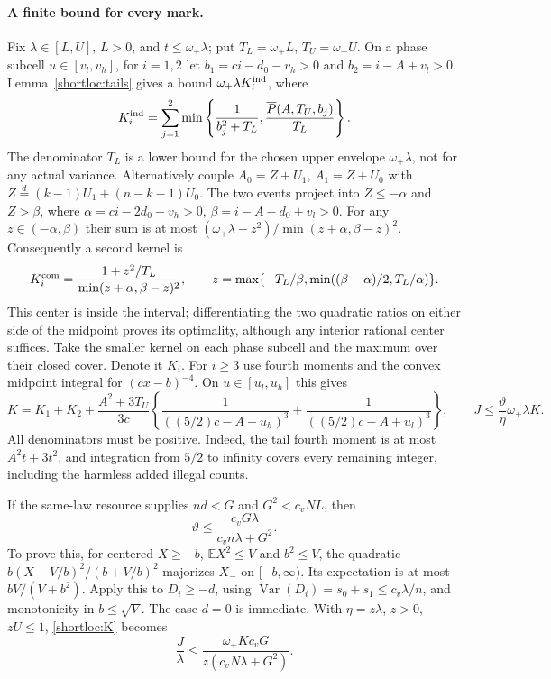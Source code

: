 \paragraph{A finite bound for every mark.}
Fix $\lambda\in[L,U]$, $L>0$, and $t\le\omega_+\lambda$; put
$T_L=\omega_+L$, $T_U=\omega_+U$. On a phase subcell $u\in[v_l,v_h]$,
for $i=1,2$ let $b_1=ci-d_0-v_h>0$ and $b_2=i-A+v_l>0$.
Lemma~\ref{shortloc:tails} gives a bound $\omega_+\lambda K_i^{\rm ind}$,
where
\[
 K_i^{\rm ind}=\sum_{j=1}^2\min\left\{\frac1{b_j^2+T_L},
                          \frac{\overline P(A,T_U,b_j)}{T_L}\right\}.
\]
The denominator $T_L$ is a lower bound for the chosen upper envelope
$\omega_+\lambda$, not for any actual variance.
Alternatively couple $A_0=Z+U_1$, $A_1=Z+U_0$ with
$Z\overset d=(k-1)U_1+(n-k-1)U_0$. The two events project into
$Z\le-\alpha$ and $Z>\beta$, where
$\alpha=ci-2d_0-v_h>0$, $\beta=i-A-d_0+v_l>0$.
For any $z\in(-\alpha,\beta)$ their sum is at most
$(\omega_+\lambda+z^2)/\min(z+\alpha,\beta-z)^2$.
Consequently a second kernel is
\[
 K_i^{\rm com}=\frac{1+z^2/T_L}{\min(z+\alpha,\beta-z)^2},\qquad
 z=\max\{-T_L/\beta,\min((\beta-\alpha)/2,T_L/\alpha)\}.
\]
This center is inside the interval; differentiating the two quadratic
ratios on either side of the midpoint proves its optimality, although
any interior rational center suffices. Take the smaller kernel on each
phase subcell and the maximum over their closed cover. Denote it $K_i$.
For $i\ge3$ use fourth moments and the convex midpoint integral for
$(cx-b)^{-4}$. On $u\in[u_l,u_h]$ this gives
\begin{equation}\label{shortloc:K}
 K=K_1+K_2+\frac{A^2+3T_U}{3c}
  \left\{\frac1{((5/2)c-A-u_h)^3}
                 +\frac1{((5/2)c-A+u_l)^3}\right\},\qquad
 J\le\frac{\vartheta}{\eta}\omega_+\lambda K.
\end{equation}
All denominators must be positive. Indeed, the tail fourth moment is at
most $A^2t+3t^2$, and integration from $5/2$ to infinity covers every
remaining integer, including the harmless added illegal counts.

If the same-law resource supplies $nd<G$ and
$G^2<c_vNL$, then
\begin{equation}\label{shortloc:theta}
 \vartheta\le\frac{c_vG\lambda}{c_vn\lambda+G^2}.
\end{equation}
To prove this, for centered $X\ge-b$, $\mathbb EX^2\le V$ and $b^2\le V$,
the quadratic $b(X-V/b)^2/(b+V/b)^2$ majorizes $X_-$ on $[-b,\infty)$.
Its expectation is at most $bV/(V+b^2)$. Apply this to $D_i\ge-d$,
using $\operatorname{Var}(D_i)=s_0+s_1\le c_v\lambda/n$, and monotonicity
in $b\le\sqrt V$. The case $d=0$ is immediate. With $\eta=z\lambda$,
$z>0$, $zU\le1$, \eqref{shortloc:K} becomes
\begin{equation}\label{shortloc:Jfinal}
 \frac J\lambda\le\frac{\omega_+Kc_vG}{z(c_vN\lambda+G^2)}.
\end{equation}

